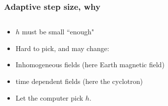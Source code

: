 \documentclass{beamer}
\begin{document}
\begin{frame}
\frametitle{Adaptive step size, why}



\begin{columns}
\begin{column}{0.5\linewidth}
\begin{itemize}
\item <1-> $h$ must be small ``enough"

\item <2-> Hard to pick, and may change:

\item <3-> Inhomogeneous fields (here Earth magnetic field)

\item <4-> time dependent fields (here the cyclotron)

\item <5-> Let the computer pick $h$.

\end{itemize}
\end{column}
\begin{column}{0.5\linewidth}


\end{column}
\end{columns}
\end{frame}
\end{document}
